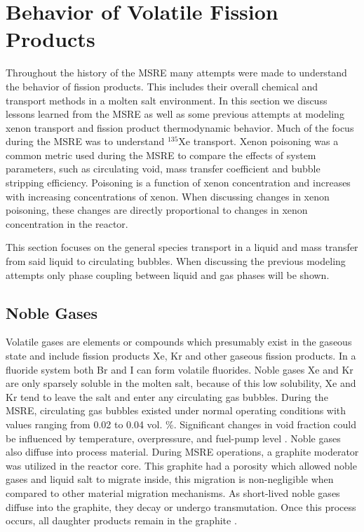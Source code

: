 \chapter{Behavior of Volatile Fission Products }\label{ch:VFP_behavior}

Throughout the history of the MSRE many attempts were made to understand the behavior of fission products. This includes their overall chemical and transport methods in a molten salt environment. In this section we discuss lessons learned from the MSRE as well as some previous attempts at modeling xenon transport and fission product thermodynamic behavior. Much of the focus during the MSRE was to understand ${}^{135}$Xe transport. Xenon poisoning was a common metric used during the MSRE to compare the effects of system parameters, such as circulating void, mass transfer coefficient and bubble stripping efficiency. Poisoning is a function of xenon concentration and increases with increasing concentrations of xenon. When discussing changes in xenon poisoning, these changes are directly proportional to changes in xenon concentration in the reactor.  

This section focuses on the general species transport in a liquid and mass transfer from said liquid to circulating bubbles. When discussing the previous modeling attempts only phase coupling between liquid and gas phases will be shown. 
\section{Noble Gases}

Volatile gases are elements or compounds which presumably exist in the gaseous state and include fission products Xe, Kr and other gaseous fission products. In a fluoride system both Br and I can form volatile fluorides. Noble gases Xe and Kr are only sparsely soluble in the molten salt, because of this low solubility, Xe and Kr tend to leave the salt and enter any circulating gas bubbles. During  the MSRE, circulating gas bubbles existed under normal operating conditions with values ranging from 0.02 to 0.04 vol. \%. Significant changes in void fraction could be influenced by temperature, overpressure, and fuel-pump level \cite{engel1971}.
Noble gases also diffuse into process material. During MSRE operations, a graphite moderator was utilized in the reactor core. This graphite had a porosity which allowed noble gases and liquid salt to migrate inside, this migration is non-negligible when compared to other material migration mechanisms. As short-lived noble gases diffuse into the graphite, they decay or undergo transmutation. Once this process occurs, all daughter products remain in the graphite \cite{kedl1967}.  

